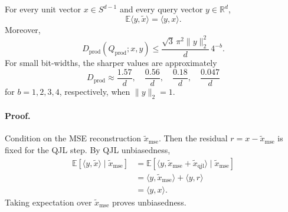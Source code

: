 \begin{theorem}
\label{thm:tq-prod}
For every unit vector $x\in S^{d-1}$ and every query vector $y\in\mathbb R^d$,
\begin{equation}
    \mathbb E\langle y,\widetilde x\rangle
    =\langle y,x\rangle.
\end{equation}
Moreover,
\begin{equation}
    D_{\mathrm{prod}}(Q_{\mathrm{prod}};x,y)
    \le
    \frac{\sqrt 3\,\pi^2\|y\|_2^2}{d}\,4^{-b}.
\end{equation}
For small bit-widths, the sharper values are approximately
\begin{equation}
    D_{\mathrm{prod}}
    \approx
    \frac{1.57}{d},
    \quad
    \frac{0.56}{d},
    \quad
    \frac{0.18}{d},
    \quad
    \frac{0.047}{d}
\end{equation}
for $b=1,2,3,4$, respectively, when $\|y\|_2=1$.
\end{theorem}

\paragraph{Proof.}
Condition on the MSE reconstruction $\widetilde x_{\mathrm{mse}}$.
Then the residual $r=x-\widetilde x_{\mathrm{mse}}$ is fixed for the QJL step.
By QJL unbiasedness,
\begin{align}
    \mathbb E[\langle y,\widetilde x\rangle\mid \widetilde x_{\mathrm{mse}}]
    &=\mathbb E[\langle y,\widetilde x_{\mathrm{mse}}+\widetilde x_{\mathrm{qjl}}\rangle\mid \widetilde x_{\mathrm{mse}}]\\
    &=\langle y,\widetilde x_{\mathrm{mse}}\rangle+\langle y,r\rangle\\
    &=\langle y,x\rangle.
\end{align}
Taking expectation over $\widetilde x_{\mathrm{mse}}$ proves unbiasedness.

